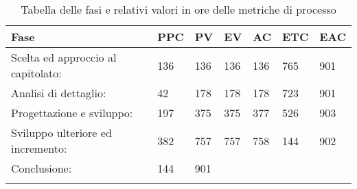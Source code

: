 

\begin{longtable}{f m m m m m m}  
			 Fase & PPC & PV & EV & AC & ETC & EAC \\
\endhead

Scelta ed approccio al capitolato: 	& 136 & 136 & 136 & 136 & 765 & 901 \\
\hline
Analisi di dettaglio: 				& 42  & 178 & 178 & 178 & 723 & 901 \\
\hline
Progettazione e sviluppo: 			& 197 & 375 & 375 & 377 & 526 & 903 \\
\hline
Sviluppo ulteriore ed incremento: 	& 382 & 757 & 757 & 758 & 144 & 902\\
\hline
Conclusione: 						& 144 & 901 \\
\hline

\bottomrule
\caption{Tabella delle fasi e relativi valori in ore delle metriche di processo}
\end{longtable}